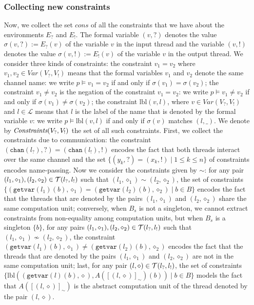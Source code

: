 \documentclass{article}
\newcommand{\bydef}{:=}
\newcommand{\Labels}{\mathcal{L}}
\newcommand{\rec}{?}
\newcommand{\eme}{!}
\newcommand{\canal}{\texttt{chan}}
\newcommand{\lrec}{l_{\rec}}
\newcommand{\leme}{l_{\eme}}
\newcommand{\Erec}{E_{\rec}}
\newcommand{\Eeme}{E_{\eme}}
\newcommand{\Vrec}{V_{\rec}}
\newcommand{\Veme}{V_{\eme}}
\newcommand{\giveindex}{\texttt{getvar}}
\newcommand{\sat}{\models}
\begin{document}
\subsubsection{Collecting new constraints}


Now, we collect the set $\textit{cons}$ of all the constraints that we have about the environments $\Erec$ and $\Eeme$.
The formal variable  $(v,?)$ denotes the value $\sigma(v,?)\bydef\Erec(v)$ of the variable $v$ in the input thread and the variable $(v,!)$ denotes the value $\sigma(v,!)\bydef\Eeme(v)$ of the variable $v$ in the output thread.
We consider three kinds of constraints:
the constraint $v_1 = v_2$  where $v_1,v_2\in\textit{Var}(\Vrec,\Veme)$ means that the formal variables $v_1$ and $v_2$ denote the same channel name: we write $p\sat v_1 = v_2$ if and only if $\sigma(v_1)=\sigma(v_2)$;
the constraint $v_1 \not= v_2$  is the negation of the constraint $v_1=v_2$: we write $p\sat v_1 \not= v_2$ if and only if $\sigma(v_1)\not =\sigma(v_2)$;
the constraint $\textrm{lbl}(v,l)$, where $v\in\textit{Var}(\Vrec,\Veme)$ and $l\in\Labels$ means that $l$ is the label of the name that is denoted by the formal variable $v$: 
we write $p\sat \textrm{lbl}(v,l)$ if and only if 
$\sigma(v)$ matches $(l,\_)$.
We denote by $\allconstraint$ the set of all such constraints.
First, we collect the constraints due to communication: 
the constraint $(\canal(\lrec),\rec)=(\canal(\leme),\eme)$ encodes the fact that both threads interact over the same channel and 
the set $\{(y_k,\rec)=(x_k,\eme)\;|\;1\leq k \leq n\}$ of constraints encodes name-passing. 
Now we consider the constraints given by $\sim$:
for any pair $(l_1,\diamond_1),(l_2,\diamond_2)\in \vartrans$ such that $(l_1,\diamond_1)\sim (l_2,\diamond_2)$,  
the set of constraints  $\{(\giveindex(l_1)(b),\diamond_1)=(\giveindex(l_2)(b),\diamond_2)\;|\;b\in B\}$ encodes the fact that the threads that are denoted by the pairs $(l_1,\diamond_1)$ and $(l_2,\diamond_2)$ share the same computation unit; 
conversely, when $B_s$ is not a singleton, we cannot extract constraints from non-equality among computation units, but  
when $B_s$ is a singleton $\{b\}$, for any pairs $(l_1,\diamond_1),(l_2,\diamond_2)\in \vartrans$ such that $(l_1,\diamond_1)\not \sim (l_2,\diamond_2)$, the constraint $(\giveindex(l_1)(b),\diamond_1)\not =(\giveindex(l_2)(b),\diamond_2)$ encodes the fact that the threads that are denoted by the pairs $(l_1,\diamond_1)$ and $(l_2,\diamond_2)$ are not in the same computation unit; 
last, for any pair $(l,\diamond)\in \vartrans$, the set of constraints $\{\textrm{lbl}((\giveindex(l)(b),\diamond),A([(l,\diamond)]_{\sim})(b))\;|\;b\in B\}$ models the fact that $A([(l,\diamond)]_{\sim})$ 
is the abstract computation unit of the thread denoted by the pair $(l,\diamond)$.
\end{document}
